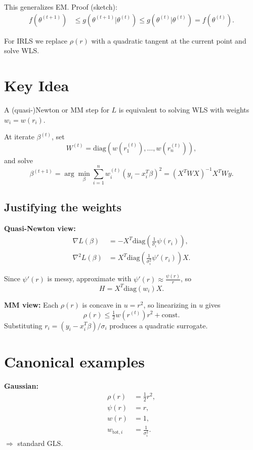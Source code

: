 \documentclass{article}
\begin{document}
This generalizes EM. Proof (sketch):
\begin{align*}
    f(\theta^{(t+1)}) &\le g(\theta^{(t+1)}|\theta^{(t)}) 
    \le g(\theta^{(t)}|\theta^{(t)}) = f(\theta^{(t)}).
\end{align*}

For IRLS we replace $\rho(r)$ with a quadratic tangent at the current point and solve WLS.

\section*{Key Idea}

A (quasi-)Newton or MM step for $L$ is equivalent to solving WLS with weights $w_i = w(r_i)$.

At iterate $\beta^{(t)}$, set
\[
W^{(t)} = \mathrm{diag}(w(r_1^{(t)}), \dots, w(r_n^{(t)})),
\]
and solve
\[
\beta^{(t+1)} = \arg\min_\beta \sum_{i=1}^n w_i^{(t)} (y_i - x_i^T \beta)^2
= (X^T W X)^{-1} X^T W y.
\]

\subsection*{Justifying the weights}

\textbf{Quasi-Newton view:}
\begin{align*}
\nabla L(\beta) &= -X^T \mathrm{diag}\!\left(\tfrac{1}{\sigma_i} \psi(r_i)\right), \\
\nabla^2 L(\beta) &= X^T \mathrm{diag}\!\left(\tfrac{1}{\sigma_i^2} \psi'(r_i)\right) X.
\end{align*}

Since $\psi'(r)$ is messy, approximate with $\psi'(r) \approx \tfrac{\psi(r)}{r}$,
so
\[
H = X^T \mathrm{diag}(w_i) X.
\]

\textbf{MM view:} Each $\rho(r)$ is concave in $u=r^2$, so linearizing in $u$ gives
\[\rho(r) \le \tfrac{1}{2} w(r^{(t)}) r^2 + \text{const}.\]
Substituting $r_i = (y_i - x_i^T \beta)/\sigma_i$ produces a quadratic surrogate.

\section*{Canonical examples}

\textbf{Gaussian:}
\begin{align*}
\rho(r) &= \tfrac{1}{2} r^2, \\
\psi(r) &= r, \\
w(r) &= 1, \\
w_{\text{tot}, i} &= \tfrac{1}{\sigma_i^2}.
\end{align*}
$\Rightarrow$ standard GLS.
\end{document}
